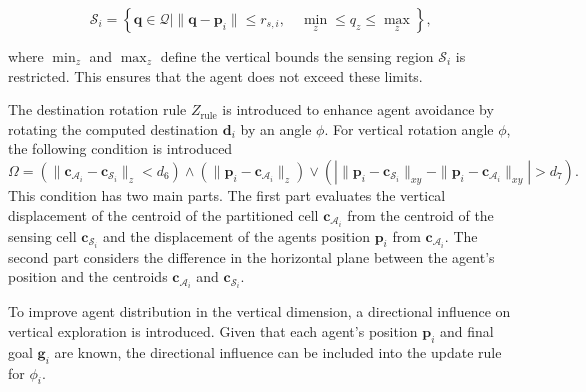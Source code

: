         \begin{equation}
            \mathcal{S}_i = \left\{\mathbf{q} \in \mathcal{Q} \mid \|\mathbf{q} - \mathbf{p}_i\| \leq r_{s,i}, \quad \min_z \leq q_z \leq \max_z \right\}\text{,}
        \end{equation}

        where $\min_z$ and $\max_z$ define the vertical bounds the sensing region $\mathcal{S}_i$ is restricted. 
        This ensures that the agent does not exceed these limits.

        The destination rotation rule $Z_{\text{rule}}$ is introduced to enhance agent avoidance by rotating the computed destination $\mathbf{d}_i$ by an angle $\phi$.
        For vertical rotation angle $\phi$, the following condition is introduced
        \begin{equation}
            \label{eqn:phi_condition}
            \Omega = (\|\mathbf{c}_{\mathcal{A}_i} - \mathbf{c}_{\mathcal{S}_i}\|_z < d_6) \land (\|\mathbf{p}_i - \mathbf{c}_{\mathcal{A}_i}\|_z) \lor 
            (| \|\mathbf{p}_i - \mathbf{c}_{\mathcal{S}_i}\|_{xy} - \|\mathbf{p}_i - \mathbf{c}_{\mathcal{A}_i}\|_{xy} | > d_7 ) \text{.}
        \end{equation}
        This condition has two main parts. The first part evaluates the vertical displacement of the centroid of the partitioned cell $\mathbf{c}_{\mathcal{A}_i}$ from the centroid of the sensing cell $\mathbf{c}_{\mathcal{S}_i}$ and the
        displacement of the agents position $\mathbf{p}_i$ from $\mathbf{c}_{\mathcal{A}_i}$.
        The second part considers the difference in the horizontal plane between the agent's position and the centroids $\mathbf{c}_{\mathcal{A}_i}$ and $\mathbf{c}_{\mathcal{S}_i}$.

        To improve agent distribution in the vertical dimension, a directional influence on vertical exploration is introduced. 
        Given that each agent's position $\mathbf{p}_i$ and final goal $\mathbf{g}_i$ are known, the directional influence can be included into the update rule for $\phi_i$.

